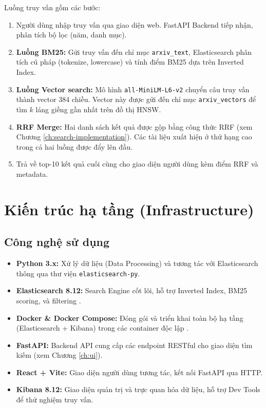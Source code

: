 \noindent Luồng truy vấn gồm các bước:
\begin{enumerate}
    \item Người dùng nhập truy vấn qua giao diện web. FastAPI Backend tiếp nhận, phân tích bộ lọc (năm, danh mục).
    \item \textbf{Luồng BM25:} Gửi truy vấn đến chỉ mục \texttt{arxiv\_text}, Elasticsearch phân tích cú pháp (tokenize, lowercase) và tính điểm BM25 dựa trên Inverted Index.
    \item \textbf{Luồng Vector search:} Mô hình \texttt{all-MiniLM-L6-v2} chuyển câu truy vấn thành vector 384 chiều. Vector này được gửi đến chỉ mục \texttt{arxiv\_vectors} để tìm $k$ láng giềng gần nhất trên đồ thị HNSW.
    \item \textbf{RRF Merge:} Hai danh sách kết quả được gộp bằng công thức RRF (xem Chương \ref{ch:search-implementation}). Các tài liệu xuất hiện ở thứ hạng cao trong cả hai luồng được đẩy lên đầu.
    \item Trả về top-10 kết quả cuối cùng cho giao diện người dùng kèm điểm RRF và metadata.
\end{enumerate}

\section{Kiến trúc hạ tầng (Infrastructure)}

\subsection{Công nghệ sử dụng}
\begin{itemize}
    \item \textbf{Python 3.x:} Xử lý dữ liệu (Data Processing) và tương tác với Elasticsearch thông qua thư viện \texttt{elasticsearch-py}.
    \item \textbf{Elasticsearch 8.12:} Search Engine cốt lõi, hỗ trợ Inverted Index, BM25 scoring, và filtering \cite{elasticsearch_docs}.
    \item \textbf{Docker \& Docker Compose:} Đóng gói và triển khai toàn bộ hạ tầng (Elasticsearch + Kibana) trong các container độc lập \cite{docker_docs}.
    \item \textbf{FastAPI:} Backend API cung cấp các endpoint RESTful cho giao diện tìm kiếm (xem Chương \ref{ch:ui}).
    \item \textbf{React + Vite:} Giao diện người dùng tương tác, kết nối FastAPI qua HTTP.
    \item \textbf{Kibana 8.12:} Giao diện quản trị và trực quan hóa dữ liệu, hỗ trợ Dev Tools để thử nghiệm truy vấn.
\end{itemize}

